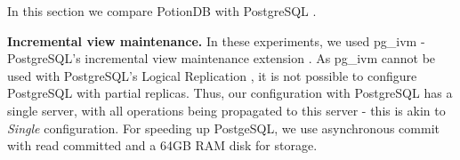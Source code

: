 \documentclass[sigplan,twocolumn,review,anonymous]{acmart}
\begin{document}

In this section we compare PotionDB with PostgreSQL \cite{PostgreSQL}.  

\noindent
\textbf{Incremental view maintenance.} %
In these experiments, we used pg\_ivm - PostgreSQL's incremental view maintenance extension \cite{ivm}. 
As pg\_ivm  cannot be used with PostgreSQL's Logical Replication \cite{PostgreSQLLogical}, it is not possible to configure PostgreSQL with partial replicas.
Thus, our configuration with PostgreSQL has a single server, with all operations being propagated to this server - this is akin to \textit{Single} configuration. 
For speeding up PostgeSQL, we use asynchronous commit with read committed and a 64GB RAM disk for storage. 

\end{document}
